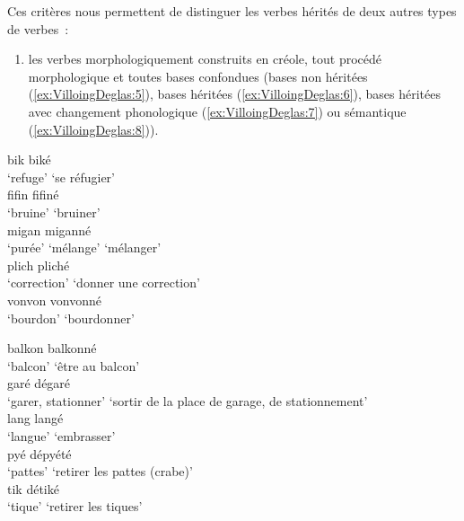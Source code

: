 \documentclass[output=paper]{langsci/langscibook}
\begin{document}
Ces critères nous permettent de distinguer les verbes hérités de deux
autres types de verbes~:

\begin{enumerate}\def\labelenumi{(\roman{enumi})}

\item
  les verbes morphologiquement construits en créole, tout procédé
  morphologique et toutes bases confondues (bases non héritées (\ref{ex:VilloingDeglas:5}),
  bases héritées (\ref{ex:VilloingDeglas:6}), bases héritées avec changement phonologique (\ref{ex:VilloingDeglas:7}) ou
  sémantique (\ref{ex:VilloingDeglas:8})).
\end{enumerate}



\ea\label{ex:VilloingDeglas:5}
  \ea \gll bik \textrightarrow{} biké\\
  {`refuge'} {} {`se réfugier'}\\
  \ex \gll fifin \textrightarrow{} fifiné\\
  {`bruine'} {} {`bruiner'}\\
  \ex \gll migan \textrightarrow{} miganné\\
  {`purée' `mélange'} {} {`mélanger'}\\
  \ex \gll plich \textrightarrow{} pliché\\
  {`correction'} {} {`donner une correction'}\\
  \ex \gll vonvon \textrightarrow{} vonvonné\\
  {`bourdon'} {} {`bourdonner'}\\
  \z

\ex\label{ex:VilloingDeglas:6}

  \ea \gll balkon \textrightarrow{} balkonné\\
  {`balcon'} {} {`être au balcon'}\\
  \ex \gll garé \textrightarrow{} dégaré\\
  {`garer, stationner'} {} {`sortir de la place de garage, de stationnement'}\\
  \ex \gll lang \textrightarrow{} langé\\
  {`langue'} {} {`embrasser'}\\
  \ex \gll pyé \textrightarrow{} dépyété\\
  {`pattes'} {} {`retirer les pattes (crabe)'}\\
  \ex \gll tik \textrightarrow{} détiké\\
  {`tique'} {} {`retirer les tiques'}\\
  \z
\end{document}
